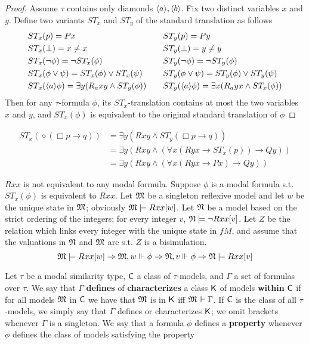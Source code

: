 \documentclass[11pt]{article}
\begin{document}
\begin{proof}
Assume \(\tau\) contains only diamonds \(\langle a\rangle,\langle b\rangle\). Fix two distinct
variables \(x\) and \(y\). Define two variants \(ST_x\) and \(ST_y\) of the
standard translation as follows
\begin{alignat*}{2}
&ST_x(p)=Px&&ST_y(p)=Py\\
&ST_x(\bot)=x\neq x\quad&&ST_y(\bot)=y\neq y\\
&ST_x(\neg\phi)=\neg ST_x(\phi)&&ST_y(\neg\phi)=\neg ST_y(\phi)\\
&ST_x(\phi\vee\psi)=ST_x(\phi)\vee ST_x(\psi)&&ST_y(\phi\vee\psi)=ST_y(\phi)\vee ST_y(\psi)\\
&ST_x(\langle a\rangle\phi)=\exists y(R_axy\wedge ST_y(\phi))\quad&&
ST_y(\langle a\rangle\phi)=\exists x(R_ayx\wedge ST_x(\phi))
\end{alignat*}
Then for any \(\tau\)-formula \(\phi\), its \(ST_x\)-translation contains at most
the two variables \(x\) and \(y\), and \(ST_x(\phi)\) is equivalent to the
original standard translation of \(\phi\)
\end{proof}

\begin{examplle}[]
\begin{align*}
ST_x(\diamond(\Box p\to q))&=
\exists y(Rxy\wedge ST_y(\Box p\to q))\\
&=\exists y(Rxy\wedge(\forall x(Ryx\to ST_x(p))\to Qy))\\
&=\exists y(Rxy\wedge(\forall x(Ryx\to Px)\to Qy))
\end{align*}
\end{examplle}

\(Rxx\) is not equivalent to any modal formula. Suppose \(\phi\) is a modal formula
s.t. \(ST_x(\phi)\) is equivalent to \(Rxx\). Let \(\mathfrak{M}\) be a singleton
reflexive model and let \(w\) be the unique state in \(\mathfrak{M}\); obviously
\(\mathfrak{M}\models Rxx[w]\). Let \(\mathfrak{N}\) be a model based on the strict ordering of
the integers; for every integer \(v\), \(\mathfrak{N}\models\neg Rxx[v]\). Let \(Z\)
be the relation which links every integer with the unique state in \(fM\),
and assume that the valuations in \(\mathfrak{N}\) and \(\mathfrak{M}\) are s.t. \(Z\) is a
bisimulation.
\begin{equation*}
\mathfrak{M}\models Rxx[w]\Rightarrow\mathfrak{M},w\Vdash\phi\Rightarrow\mathfrak{N},v\Vdash\phi
\Rightarrow\mathfrak{N}\models Rxx[v]
\end{equation*}

\begin{definition}[]
Let \(\tau\) be a modal similarity type, \(\textsf{C}\) a class of \(\tau\)-models, and \(\Gamma\)
a set of formulas over \(\tau\). We say that \(\Gamma\) \textbf{defines} of \textbf{characterizes} a class
\(\textsf{K}\) of models \textbf{within} \(\textsf{C}\) if for all models \(\mathfrak{M}\) in \(\textsf{C}\) we
have that \(\mathfrak{M}\) is in \(\textsf{K}\) iff \(\mathfrak{M}\Vdash\Gamma\). If \(\textsf{C}\) is the
class of all \(\tau\)-models, we simply say that \(\Gamma\) defines or characterizes
\(\textsf{K}\); we omit brackets whenever \(\Gamma\) is a singleton. We say that a formula \(\phi\)
defines a \textbf{property} whenever \(\phi\) defines the class of models satisfying the property
\end{definition}
\end{document}
